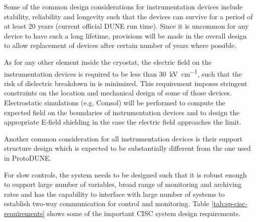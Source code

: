 Some of the common design considerations for
instrumentation devices include stability, reliability and longevity
such that the devices can survive for a period of at least 20 years
(current official DUNE run time).  Since it is uncommon for any device
to have such a long lifetime, provisions will be made in the overall
design to allow replacement of devices after certain number of
years where possible.

As for any other element inside the cryostat, 
the electric field on the instrumentation devices is 
required to be less than \SI{30}{kV\per\cm},
such that the risk of dielectric breakdown in  is minimized.
This requirement imposes stringent constraints on the location and mechanical 
design of some of those devices. Electrostatic simulations (e.g. Comsol) 
will be performed to compute the expected field on the boundaries of 
instrumentation devices and to design the appropriate E-field shielding
in the case the electric field approaches the limit. 

Another common consideration for all instrumentation devices is their support structure
design which is expected to be substantially different from the one used in ProtoDUNE.

For slow controls, the system needs to be designed such that it is
robust enough to support large number of variables, broad range of
monitoring and archiving rates and has the capability to interface
with large number of systems to establish two-way communication for
control and monitoring. Table \ref{tab:sp-cisc-requirements} shows
some of the important CISC system design requirements.


